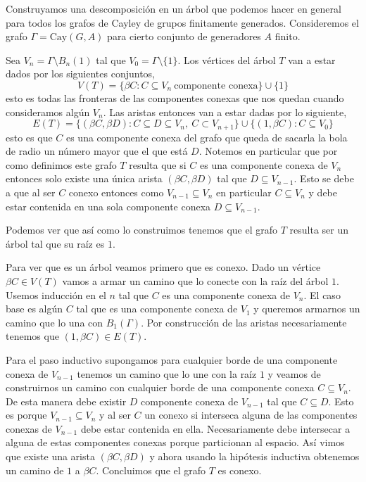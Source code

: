 \documentclass[tesis.tex]{subfiles}
\begin{document}
\begin{ej}\label{desc-grafo-cayley}%
	
	Construyamos una descomposición en un árbol que podemos hacer en general para todos los grafos de Cayley de grupos finitamente generados. 
	Consideremos el grafo $\Gamma = \text{Cay}(G,A)$ para cierto conjunto de generadores $A$ finito.
	
	
	Sea $V_n = \Gamma \setminus B_n(1) $ tal que $V_0 = \Gamma \setminus \{1\}$. 
	Los vértices del árbol $T$ van a estar dados por los siguientes conjuntos,
	\[
	V(T) = \{  \beta C : C \subseteq V_n \ \text{componente conexa}   \} \cup \{ 1 \}
	\]
	esto es todas las fronteras de las componentes conexas que nos quedan cuando consideramos algún $V_n$. 
	Las aristas entonces van a estar dadas por lo siguiente,
	\[
	E(T) = \{ (\beta C , \beta D) : C \subseteq D \subseteq V_n, \ C \subset V_{n+1}   \} \cup \{  (1, \beta C) : C \subseteq V_0  \}
	\]
	esto es que $C$ es una componente conexa del grafo que queda de sacarla la bola de radio un número mayor que el que está $D$.
	Notemos en particular que por como definimos este grafo $T$ resulta que si $C$ es una componente conexa de $V_n$ entonces solo existe una única arista $(\beta C, \beta D)$ tal que $D \subseteq V_{n-1}$. 
	Esto se debe a que al ser $C$ conexo entonces como $V_{n-1} \subseteq V_{n}$ en particular $C \subseteq V_{n}$ y debe estar contenida en una sola componente conexa $D \subseteq V_{n-1}.$
	
	
	Podemos ver que así como lo construimos tenemos que el grafo $T$ resulta ser un árbol tal que su raíz es $1$. 
	
	Para ver que es un árbol veamos primero que es conexo. Dado un vértice $\beta C \in V(T)$ vamos a armar un camino que lo conecte con la raíz del árbol $1$. 
	Usemos inducción en el $n$ tal que $C$ es una componente conexa de $V_n$. 
	El caso base es algún $C$ tal que es una componente conexa de $V_1$ y queremos armarnos un camino que lo una con $B_1(\Gamma)$. 
	Por construcción de las aristas necesariamente tenemos que $(1, \beta C) \in E(T)$.
		
	Para el paso inductivo supongamos para cualquier borde de una componente conexa de $V_{n-1}$ tenemos un camino que lo une con la raíz $1$ y veamos de construirnos un camino con cualquier borde de una componente conexa $C \subseteq V_n$.
	De esta manera debe existir $D$ componente conexa de $V_{n-1}$ tal que $C \subseteq D$. Esto es porque $V_{n-1} \subseteq V_{n}$ y al ser $C$ un conexo si interseca alguna de las componentes conexas de $V_{n-1}$ debe estar contenida en ella. 
	Necesariamente debe intersecar a alguna de estas componentes conexas porque particionan al espacio.
	Así vimos que existe una arista $(\beta C, \beta D)$ y ahora usando la hipótesis inductiva obtenemos un camino de $1$ a $\beta C$.
	Concluimos que el grafo $T$ es conexo.   
	

\end{ej}
\end{document}
